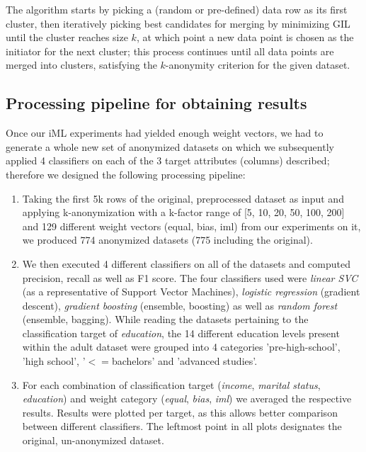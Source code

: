 \documentclass{llncs}
\begin{document}
The algorithm starts by picking a (random or pre-defined) data row as its first cluster, then iteratively picking best candidates for merging by minimizing GIL until the cluster reaches size $k$, at which point a new data point is chosen as the initiator for the next cluster; this process continues until all data points are merged into clusters, satisfying the $k$-anonymity criterion for the given dataset.


\subsection{Processing pipeline for obtaining results}
\label{ssect:process}

Once our iML experiments had yielded enough weight vectors, we had to generate a whole new set of anonymized datasets on which we subsequently applied 4 classifiers on each of the 3 target attributes (columns) described; therefore we designed the following processing pipeline:


\begin{enumerate}
	\item Taking the first 5k rows of the original, preprocessed dataset as input and applying k-anonymization with a k-factor range of [5, 10, 20, 50, 100, 200] and 129 different weight vectors (equal, bias, iml) from our experiments on it, we produced 774 anonymized datasets (775 including the original).
	\item We then executed 4 different classifiers on all of the datasets and computed precision, recall as well as F1 score. The four classifiers used were \textit{linear SVC} (as a representative of Support Vector Machines), \textit{logistic regression} (gradient descent), \textit{gradient boosting} (ensemble, boosting) as well as \textit{random forest} (ensemble, bagging). While reading the datasets pertaining to the classification target of \textit{education}, the 14 different education levels present within the adult dataset were grouped into 4 categories 'pre-high-school', 'high school', '$<=$bachelors' and 'advanced studies'.
	\item For each combination of classification target (\textit{income}, \textit{marital status}, \textit{education}) and weight category (\textit{equal}, \textit{bias}, \textit{iml}) we averaged the respective results. Results were plotted per target, as this allows better comparison between different classifiers. The leftmost point in all plots designates the original, un-anonymized dataset.
\end{enumerate}
\end{document}
